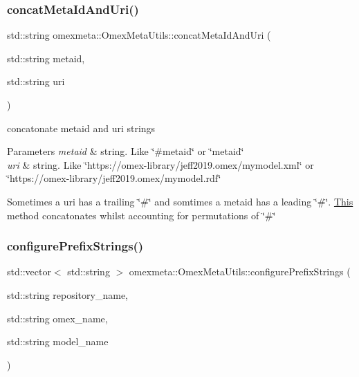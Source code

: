 \subsubsection{\texorpdfstring{concat\+Meta\+Id\+And\+Uri()}{concatMetaIdAndUri()}}
{\footnotesize\ttfamily std\+::string omexmeta\+::\+Omex\+Meta\+Utils\+::concat\+Meta\+Id\+And\+Uri (\begin{DoxyParamCaption}\item[{std\+::string}]{metaid,  }\item[{std\+::string}]{uri }\end{DoxyParamCaption})\hspace{0.3cm}{\ttfamily [static]}}



concatonate metaid and uri strings 


\begin{DoxyParams}{Parameters}
{\em metaid} & string. Like \char`\"{}\#metaid\char`\"{} or \char`\"{}metaid\char`\"{} \\
\hline
{\em uri} & string. Like \char`\"{}https\+://omex-\/library/jeff2019.\+omex/mymodel.\+xml\char`\"{} or \char`\"{}https\+://omex-\/library/jeff2019.\+omex/mymodel.\+rdf\char`\"{}\\
\hline
\end{DoxyParams}
Sometimes a uri has a trailing \char`\"{}\#\char`\"{} and somtimes a metaid has a leading \char`\"{}\#\char`\"{}. \hyperlink{classThis}{This} method concatonates whilst accounting for permutations of \char`\"{}\#\char`\"{} \mbox{\label{classomexmeta_1_1OmexMetaUtils_a744a0575136f1cc60b76a6560a5595e9}} 
\subsubsection{\texorpdfstring{configure\+Prefix\+Strings()}{configurePrefixStrings()}}
{\footnotesize\ttfamily std\+::vector$<$ std\+::string $>$ omexmeta\+::\+Omex\+Meta\+Utils\+::configure\+Prefix\+Strings (\begin{DoxyParamCaption}\item[{std\+::string}]{repository\+\_\+name,  }\item[{std\+::string}]{omex\+\_\+name,  }\item[{std\+::string}]{model\+\_\+name }\end{DoxyParamCaption})\hspace{0.3cm}{\ttfamily [static]}}



